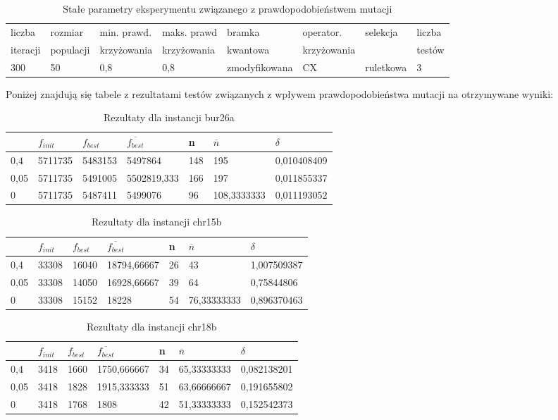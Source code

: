 \begin{table}[H]
\label{T4_params}
\begin{tabular}{l l l l l l l l}
\hline
liczba & rozmiar & min. prawd. & maks. prawd & bramka & operator. & selekcja & liczba \\
iteracji & populacji & krzyżowania & krzyżowania & kwantowa & krzyżowania & & testów \\
\hline
300 & 50 & 0,8 & 0,8 & zmodyfikowana & CX & ruletkowa & 3 \\
\hline
\end{tabular}
\caption{Stałe parametry eksperymentu związanego z prawdopodobieństwem mutacji}
\end{table}

Poniżej znajdują się tabele z rezultatami testów związanych z wpływem prawdopodobieństwa mutacji na otrzymywane wyniki:

\begin{table}[H]
\label{T4_bur26a}
\begin{tabular}{l l l l l l l}
\hline
 & $f_{init}$ & $f_{best}$ & $\overline{f_{best}}$ & n & $\overline{n}$ & $\delta$ \\
\hline
0,4 & 5711735 & 5483153 & 5497864 & 148 & 195 & 0,010408409\\
0,05 & 5711735 & 5491005 & 5502819,333 & 166 & 197 & 0,011855337\\
0 & 5711735 & 5487411 & 5499076 & 96 & 108,3333333 & 0,011193052\\
\hline
\end{tabular}
\caption{Rezultaty dla instancji bur26a}
\end{table}

\begin{table}[H]
\label{T4_chr15b}
\begin{tabular}{l l l l l l l}
\hline
 & $f_{init}$ & $f_{best}$ & $\overline{f_{best}}$ & n & $\overline{n}$ & $\delta$ \\
\hline
0,4 & 33308 & 16040 & 18794,66667 & 26 & 43 & 1,007509387\\
0,05 & 33308 & 14050 & 16928,66667 & 39 & 64 & 0,75844806\\
0 & 33308 & 15152 & 18228 & 54 & 76,33333333 & 0,896370463\\
\hline
\end{tabular}
\caption{Rezultaty dla instancji chr15b}
\end{table}

\begin{table}[H]
\label{T4_chr18b}
\begin{tabular}{l l l l l l l}
\hline
 & $f_{init}$ & $f_{best}$ & $\overline{f_{best}}$ & n & $\overline{n}$ & $\delta$ \\
\hline
0,4 & 3418 & 1660 & 1750,666667 & 34 & 65,33333333 & 0,082138201\\
0,05 & 3418 & 1828 & 1915,333333 & 51 & 63,66666667 & 0,191655802\\
0 & 3418 & 1768 & 1808 & 42 & 51,33333333 & 0,152542373\\
\hline
\end{tabular}
\caption{Rezultaty dla instancji chr18b}
\end{table}


